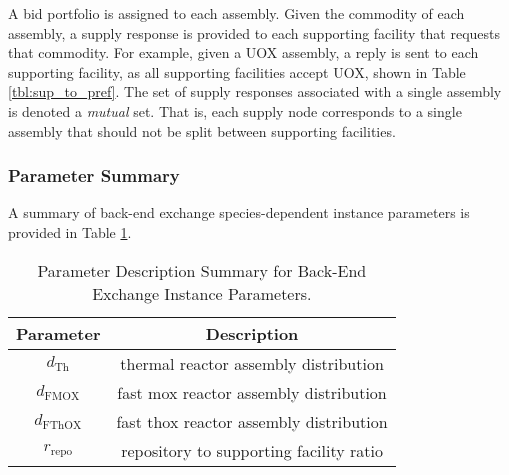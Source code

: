 A bid portfolio is assigned to each assembly. Given the commodity of each
assembly, a supply response is provided to each supporting facility that requests
that commodity. For example, given a UOX assembly, a reply is sent to each
supporting facility, as all supporting facilities accept UOX, shown in Table
\ref{tbl:sup_to_pref}. The set of supply responses associated with a single
assembly is denoted a \textit{mutual} set. That is, each supply node corresponds
to a single assembly that should not be split between supporting facilities.

\subsubsection{Parameter Summary}

A summary of back-end exchange species-dependent instance parameters is provided
in Table \ref{tbl:back_params}.

\begin{table}[h!]
\centering
\caption{Parameter Description Summary for Back-End Exchange Instance
  Parameters.}
\label{tbl:back_params}
\begin{tabular}{|c|c|}
\hline
Parameter    & 
Description
\\ \hline
$d_{\text{Th}}$     & 
thermal reactor assembly distribution
\\ \hline
$d_{\text{FMOX}}$     & 
fast mox reactor assembly distribution
\\ \hline
$d_{\text{FThOX}}$     & 
fast thox reactor assembly distribution
\\ \hline
$r_{\text{repo}}$     & 
repository to supporting facility ratio
\\ \hline
\end{tabular}
\end{table}
